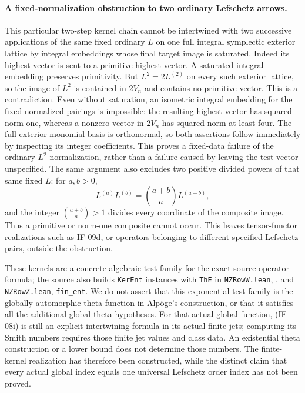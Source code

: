 \documentclass[11pt,a4paper]{article}
\theoremstyle{definition}
\theoremstyle{remark}
\begin{document}
\paragraph{A fixed-normalization obstruction to two ordinary Lefschetz arrows.}
This particular two-step kernel chain cannot be intertwined with two
successive applications of the same fixed ordinary $L$ on one full
integral symplectic exterior lattice by integral embeddings whose
final target image is saturated. Indeed its highest vector is
sent to a primitive highest vector. A saturated integral embedding
preserves primitivity. But $L^2=2L^{(2)}$ on every such exterior
lattice, so the image of $L^2$ is contained in $2V_n$ and contains no
primitive vector. This is a contradiction. Even without saturation,
an isometric integral embedding for the fixed normalized pairings is
impossible: the resulting highest vector has squared norm one, whereas
a nonzero vector in $2V_n$ has squared norm at least four. The full
exterior monomial basis is orthonormal, so both assertions follow
immediately by inspecting its integer coefficients. This proves a
fixed-data failure of the ordinary-$L^2$ normalization, rather than a
failure caused by leaving the test vector unspecified. The same argument
also excludes two positive divided powers of that same fixed $L$:
for $a,b>0$,
\[
 L^{(a)}L^{(b)}=\binom{a+b}{a}L^{(a+b)},
\]
and the integer $\binom{a+b}{a}>1$ divides every coordinate of the
composite image. Thus a primitive or norm-one composite cannot occur.
This leaves tensor-functor realizations such as IF-09d, or operators
belonging to different specified Lefschetz pairs, outside the
obstruction.

These kernels are a concrete algebraic test family for the exact
source operator formula; the source also builds \texttt{KerEnt}
instances with \texttt{ThE} in \texttt{NZRowW.lean},
, and \texttt{NZRowZ.lean},
\texttt{fin\_ent}. We do not assert that this exponential test family
is the globally automorphic theta function in Alp\"oge's construction,
or that it satisfies all the additional global theta hypotheses.
For that actual global function, (IF-08i) is still an explicit
intertwining formula in its actual finite jets; computing its Smith
numbers requires those finite jet values and class data. An
existential theta construction or a lower bound does not determine
those numbers. The finite-kernel realization has therefore been
constructed, while the distinct claim that every actual global index
equals one universal Lefschetz order index has not been proved.
\end{document}
